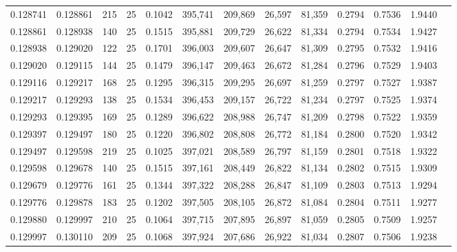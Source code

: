 \begin{tabular}{rrrrrrrrrrrrr}
0.128741 & 0.128861 &   215 &  25 &                                     0.1042 & 395,741 & 209,869 &  26,597 &  81,359 & 0.2794 & 0.7536 & 1.9440 \\
0.128861 & 0.128938 &   140 &  25 &                                     0.1515 & 395,881 & 209,729 &  26,622 &  81,334 & 0.2794 & 0.7534 & 1.9427 \\
0.128938 & 0.129020 &   122 &  25 &                                     0.1701 & 396,003 & 209,607 &  26,647 &  81,309 & 0.2795 & 0.7532 & 1.9416 \\
0.129020 & 0.129115 &   144 &  25 &                                     0.1479 & 396,147 & 209,463 &  26,672 &  81,284 & 0.2796 & 0.7529 & 1.9403 \\
0.129116 & 0.129217 &   168 &  25 &                                     0.1295 & 396,315 & 209,295 &  26,697 &  81,259 & 0.2797 & 0.7527 & 1.9387 \\
0.129217 & 0.129293 &   138 &  25 &                                     0.1534 & 396,453 & 209,157 &  26,722 &  81,234 & 0.2797 & 0.7525 & 1.9374 \\
0.129293 & 0.129395 &   169 &  25 &                                     0.1289 & 396,622 & 208,988 &  26,747 &  81,209 & 0.2798 & 0.7522 & 1.9359 \\
0.129397 & 0.129497 &   180 &  25 &                                     0.1220 & 396,802 & 208,808 &  26,772 &  81,184 & 0.2800 & 0.7520 & 1.9342 \\
0.129497 & 0.129598 &   219 &  25 &                                     0.1025 & 397,021 & 208,589 &  26,797 &  81,159 & 0.2801 & 0.7518 & 1.9322 \\
0.129598 & 0.129678 &   140 &  25 &                                     0.1515 & 397,161 & 208,449 &  26,822 &  81,134 & 0.2802 & 0.7515 & 1.9309 \\
0.129679 & 0.129776 &   161 &  25 &                                     0.1344 & 397,322 & 208,288 &  26,847 &  81,109 & 0.2803 & 0.7513 & 1.9294 \\
0.129776 & 0.129878 &   183 &  25 &                                     0.1202 & 397,505 & 208,105 &  26,872 &  81,084 & 0.2804 & 0.7511 & 1.9277 \\
0.129880 & 0.129997 &   210 &  25 &                                     0.1064 & 397,715 & 207,895 &  26,897 &  81,059 & 0.2805 & 0.7509 & 1.9257 \\
0.129997 & 0.130110 &   209 &  25 &                                     0.1068 & 397,924 & 207,686 &  26,922 &  81,034 & 0.2807 & 0.7506 & 1.9238 \\

\end{tabular}
